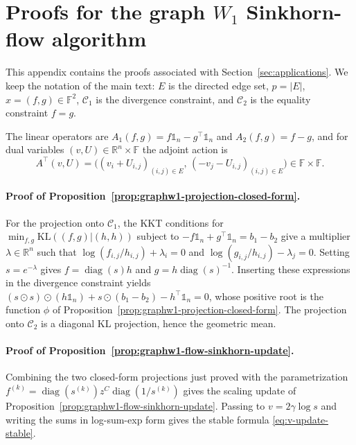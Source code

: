\documentclass{article}
\theoremstyle{plain}
\newcommand{\ones}{\mathds{1}}
\newcommand{\Edge}{E}
\newcommand{\RR}{\mathbb{R}}
\newcommand{\Cc}{\mathcal{C}}
\DeclareMathOperator{\diag}{diag}
\newcommand{\KLdiv}[2]{\mathrm{KL}(#1|#2)}
\begin{document}
\section{Proofs for the graph \texorpdfstring{$W_1$}{W1} Sinkhorn-flow algorithm}
\label{app-app:w1-proofs}

\providecommand{\Geod}{D}
\providecommand{\Flows}{\mathbb{F}}

This appendix contains the proofs associated with Section~\ref{sec:applications}. We keep the notation of the main text: $\Edge$ is the directed edge set, $p=|\Edge|$, $x=(f,g)\in\Flows^2$, $\Cc_1$ is the divergence constraint, and $\Cc_2$ is the equality constraint $f=g$.

The linear operators are $A_1(f,g)=f\ones_n-g^\top\ones_n$ and $A_2(f,g)=f-g$, and for dual variables $(v,U)\in\RR^n\times\Flows$ the adjoint action is
\begin{equation}
\label{app-app-eq:At_action}
A^\top(v,U)=\Big((v_i+U_{i,j})_{(i,j)\in\Edge},\,(-v_j-U_{i,j})_{(i,j)\in\Edge}\Big)\in\Flows\times\Flows.
\end{equation}

\paragraph{Proof of Proposition~\ref{prop:graphw1-projection-closed-form}.}
For the projection onto $\Cc_1$, the KKT conditions for $\min_{f,g}\KLdiv{(f,g)}{(h,h)}$ subject to $-f\ones_n+g^\top\ones_n=b_1-b_2$ give a multiplier $\lambda\in\RR^n$ such that $\log(f_{i,j}/h_{i,j})+\lambda_i=0$ and $\log(g_{i,j}/h_{i,j})-\lambda_j=0$. Setting $s=e^{-\lambda}$ gives $f=\diag(s)h$ and $g=h\diag(s)^{-1}$. Inserting these expressions in the divergence constraint yields $(s\odot s)\odot(h\ones_n)+s\odot(b_1-b_2)-h^\top\ones_n=0$, whose positive root is the function $\phi$ of Proposition~\ref{prop:graphw1-projection-closed-form}. The projection onto $\Cc_2$ is a diagonal KL projection, hence the geometric mean.

\paragraph{Proof of Proposition~\ref{prop:graphw1-flow-sinkhorn-update}.}
Combining the two closed-form projections just proved with the parametrization $f^{(k)}=\diag(s^{(k)})z^C\diag(1/s^{(k)})$ gives the scaling update of Proposition~\ref{prop:graphw1-flow-sinkhorn-update}. Passing to $v=2\gamma\log s$ and writing the sums in log-sum-exp form gives the stable formula \eqref{eq:v-update-stable}.
\end{document}
